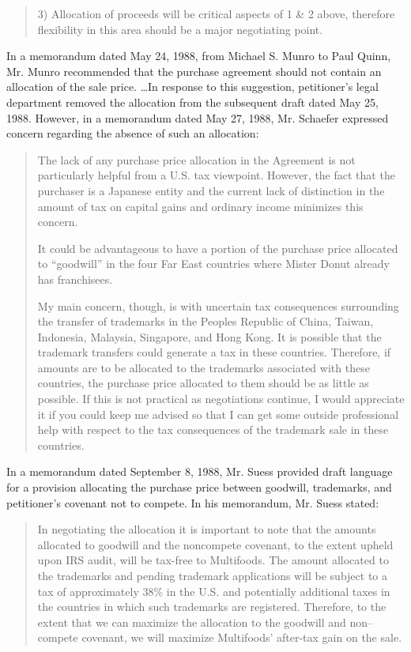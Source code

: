 \begin{select}
\begin{quote}
3) Allocation of proceeds will be critical aspects of 1 \& 2 above, therefore flexibility in this area should
be a major negotiating point.
\end{quote}

In a memorandum dated May 24, 1988, from Michael S. Munro to Paul Quinn, Mr. Munro recommended that the
purchase agreement should not contain an allocation of the sale price. \ldots In response to this suggestion, petitioner's legal department removed the allocation from the subsequent draft dated May 25, 1988. However, in a memorandum dated May 27, 1988, Mr. Schaefer expressed concern regarding the absence of such an allocation:

\begin{quote}The lack of any purchase price allocation in the Agreement is not particularly helpful from a U.S. tax
viewpoint. However, the fact that the purchaser is a Japanese entity and the current lack of distinction in the
amount of tax on capital gains and ordinary income minimizes this concern.

It could be advantageous to have a portion of the purchase price allocated to ``goodwill'' in the four Far East
countries where Mister Donut already has franchisees.

My main concern, though, is with uncertain tax consequences surrounding the transfer of trademarks in the
Peoples Republic of China, Taiwan, Indonesia, Malaysia, Singapore, and Hong Kong. It is possible that
the trademark transfers could generate a tax in these countries. Therefore, if amounts are to be allocated to
the trademarks associated with these countries, the purchase price allocated to them should be as little as
possible. If this is not practical as negotiations continue, I would appreciate it if you could keep me advised
so that I can get some outside professional help with respect to the tax consequences of the trademark sale in
these countries.
\end{quote}
In a memorandum dated September 8, 1988, Mr. Suess provided draft language for a provision allocating the purchase
price between goodwill, trademarks, and petitioner's covenant not to compete. In his memorandum, Mr. Suess
stated:
\begin{quote}In negotiating the allocation it is important to note that the amounts allocated to goodwill and the
noncompete covenant, to the extent upheld upon IRS audit, will be tax-free to Multifoods. The amount allocated to the trademarks and pending trademark applications will be subject to a tax of approximately 38\% in the U.S. and potentially additional taxes in the countries in which such trademarks are registered. Therefore, to the extent that we can maximize the allocation to the goodwill and non--compete covenant, we will maximize Multifoods' after-tax gain on the sale.


\end{quote}
\end{select}
